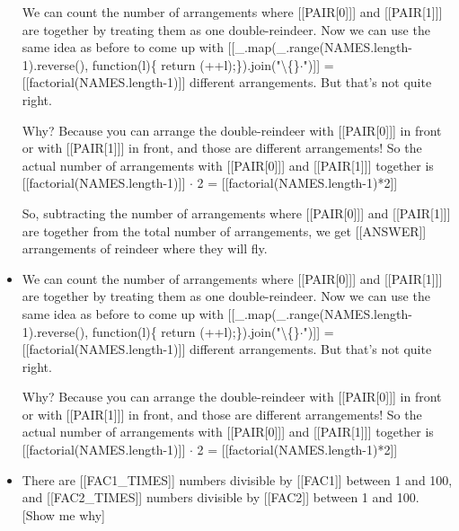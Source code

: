 \documentclass{article}
\begin{document}
\begin{itemize}
                        
                            We can count the number of arrangements where [[PAIR[0]]] and [[PAIR[1]]] are together by treating them as one double-reindeer. Now we can use the same idea as before to come up with [[\_.map(\_.range(NAMES.length-1).reverse(), function(l)\{ return (++l);\}).join("\textbackslash\{\}$\cdot$")]] = [[factorial(NAMES.length-1)]] different arrangements. But that's not quite right.
                        
                        
                            Why? Because you can arrange the double-reindeer with [[PAIR[0]]] in front or with
                            [[PAIR[1]]] in front, and those are different arrangements! So the actual number of arrangements with [[PAIR[0]]]
                            and [[PAIR[1]]] together is [[factorial(NAMES.length-1)]] $\cdot$ 2 =
                            [[factorial(NAMES.length-1)*2]]
                        
                        
                            So, subtracting the number of arrangements where [[PAIR[0]]] and [[PAIR[1]]] are together from the total number
                            of arrangements, we get [[ANSWER]] arrangements of reindeer where they will fly.
  \item We can count the number of arrangements where [[PAIR[0]]] and [[PAIR[1]]] are together by treating them as one double-reindeer. Now we can use the same idea as before to come up with [[\_.map(\_.range(NAMES.length-1).reverse(), function(l)\{ return (++l);\}).join("\textbackslash\{\}$\cdot$")]] = [[factorial(NAMES.length-1)]] different arrangements. But that's not quite right.
                        
                        
                            Why? Because you can arrange the double-reindeer with [[PAIR[0]]] in front or with
                            [[PAIR[1]]] in front, and those are different arrangements! So the actual number of arrangements with [[PAIR[0]]]
                            and [[PAIR[1]]] together is [[factorial(NAMES.length-1)]] $\cdot$ 2 =
                            [[factorial(NAMES.length-1)*2]]
  \item There are [[FAC1\_TIMES]] numbers divisible by [[FAC1]] between 1
                            and 100, and [[FAC2\_TIMES]] numbers divisible by
                            [[FAC2]] between 1 and 100.
                            [Show me why]
                        
                        
                            

\end{itemize}
\end{document}
